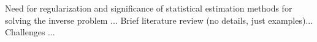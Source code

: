 \documentclass[journal]{IEEEtran}
\begin{document}
Need for regularization and significance of statistical estimation methods for solving the inverse problem ... Brief literature review (no details, just examples)... Challenges ...\\


 
\end{document}
